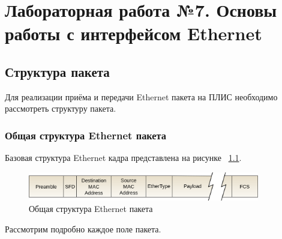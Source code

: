 \chapter{Лабораторная работа №7. Основы работы с интерфейсом Ethernet}

\section{Структура пакета}
Для реализации приёма и передачи Ethernet пакета на ПЛИС необходимо рассмотреть структуру пакета. 

\subsection{Общая структура Ethernet пакета}

Базовая структура Ethernet кадра представлена на рисунке ~\ref{Ethernet_frame}. 

\begin{figure}[h]
	\centering
	\includegraphics[width=0.9\textwidth]{image/Ethernet_frame}
	\caption{Общая структура Ethernet пакета}
	\label{Ethernet_frame}
\end{figure}

Рассмотрим подробно каждое поле пакета.


